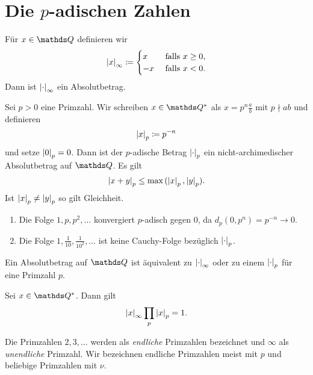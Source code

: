 \chapter{Die $p$-adischen Zahlen}
Für $x\in \Q$ definieren wir
\begin{align*}
\left\vert x\right\vert_\infty\coloneqq\begin{cases}
x &\text{ falls } x\geq 0,\\
-x &\text{ falls } x<0.
\end{cases}
\end{align*}
Dann ist $\left\vert\cdot\right\vert_\infty$ ein Absolutbetrag.

Sei $p>0$ eine Primzahl. Wir schreiben $x\in \Q^\ast$ als $x=p^n \frac{a}{b}$ mit $p \nmid ab$ und definieren
\begin{align*}
\left\vert x\right\vert_p \coloneqq p^{-n}
\end{align*}
und setze $\left\vert0\right\vert_p=0$.
Dann ist der $p$-adische Betrag $\left\vert\cdot\right\vert_p$ ein nicht-archimedischer Absolutbetrag auf $\Q$.
Es gilt
\begin{align*}
\left\vert x+y\right\vert_p\leq \max{(\left\vert x\right\vert_p,\left\vert y\right\vert_p)}.
\end{align*}
Ist $\left\vert x\right\vert_p \not= \left\vert y\right\vert_p$ so gilt Gleichheit.
\begin{bsp}

\begin{enumerate}[label=\roman*)]
\item Die Folge $1,p,p^2,\dots$ konvergiert $p$-adisch gegen $0$, da $d_p(0,p^n)=p^{-n}\to 0$.
\item Die Folge $1,\frac{1}{10},\frac{1}{10^2},\dots$ ist keine Cauchy-Folge bezüglich $\left\vert\cdot\right\vert_p$.
\end{enumerate}
\end{bsp}

\begin{thm}[Ostrowski]
Ein Absolutbetrag auf $\Q$ ist äquivalent zu $\left\vert\cdot\right\vert_\infty$ oder zu einem $\left\vert\cdot\right\vert_p$ für eine Primzahl $p$.
\end{thm}

\begin{satz}[Produktformel]
Sei $x\in \Q^\ast$. Dann gilt
\begin{align*}
\left\vert x\right\vert_\infty \prod_p \left\vert x\right\vert_p=1.
\end{align*}
\end{satz}

\begin{bem}
Die Primzahlen $2,3,\dots$ werden als \emph{endliche} Primzahlen bezeichnet und $\infty$ als \emph{unendliche} Primzahl.
Wir bezeichnen endliche Primzahlen meist mit $p$ und beliebige Primzahlen mit $\nu$.
\end{bem}

